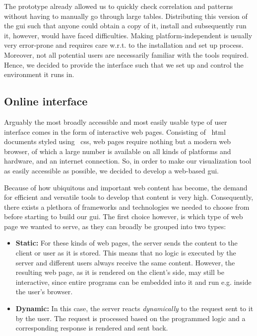 \documentclass[\relativeRoot/main.tex]{subfiles}
\begin{document}
The prototype already allowed us to quickly check correlation and patterns without having to manually go through large tables. Distributing this version of the \gls{gui} such that anyone could obtain a copy of it, install and subsequently run it, however, would have faced difficulties. Making  platform-independent is usually very error-prone and requires care w.r.t. to the installation and set up process. Moreover, not all potential users are necessarily familiar with the tools required. Hence, we decided to provide the interface such that we set up and control the environment it runs in.

\subsection*{Online interface}
\label{subsec:lyprox:motivation:online}

Arguably the most broadly accessible and most easily usable type of user interface comes in the form of interactive web pages. Consisting of ~\acrshort{html} documents styled using ~\acrshort{css}, web pages require nothing but a modern web browser, of which a large number is available on all kinds of platforms and hardware, and an internet connection. So, in order to make our visualization tool as easily accessible as possible, we decided to develop a web-based \gls{gui}.

Because of how ubiquitous and important web content has become, the demand for efficient and versatile tools to develop that content is very high. Consequently, there exists a plethora of frameworks and technologies we needed to choose from before starting to build our \gls{gui}. The first choice however, is which type of web page we wanted to serve, as they can broadly be grouped into two types:

\begin{itemize}
    \item \textbf{Static:} For these kinds of web pages, the server sends the content to the client or user as it is stored. This means that no logic is executed by the server and different users always receive the same content. However, the resulting web page, as it is rendered on the client's side, may still be interactive, since entire programs can be embedded into it and run e.g. inside the user's browser.
    \item \textbf{Dynamic:} In this case, the server reacts \emph{dynamically} to the request sent to it by the user. The request is processed based on the programmed logic and a corresponding response is rendered and sent back.
\end{itemize}
\end{document}
